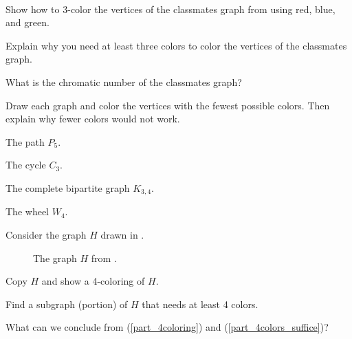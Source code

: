 \begin{exer}[\exerU] %
\label{exer_chromatic_number_classmates_graph}
~
    \begin{exerpart}
        \item Show how to 3-color the vertices of the classmates graph from  using red, blue, and green. 
        \item Explain why you need at least three colors to color the vertices of the classmates graph.
        \item What is the chromatic number of the classmates graph?  
    \end{exerpart}    
\end{exer}

\begin{exer} [\exerU] %
\label{exer_coloring_complete}
    Draw each graph and color the vertices with the fewest possible colors. Then explain why fewer colors would not work.  
    \begin{exerpart}
        \item The path $P_5$.
        \item The cycle $C_3$.
        \item The complete bipartite graph $K_{3,4}$.        
        \item The wheel $W_4$.
    \end{exerpart}
\end{exer}

\begin{exer} [\exerU] %
\label{exer_color_complicated_graph}
   Consider the graph $H$ drawn in .
        \begin{figure}[htbp]
            \centering
            
            \caption{The graph $H$ from .}
            \label{fig_complicated_graph}
        \end{figure}
    \begin{exerpart}
        \item \label{part_4coloring} Copy $H$ and show a 4-coloring of $H$.
        \item \label{part_4colors_suffice} Find a subgraph (portion) of $H$ that needs at least 4 colors.
        \item What can we conclude from (\ref{part_4coloring}) and (\ref{part_4colors_suffice})?
    \end{exerpart}   
\end{exer}

